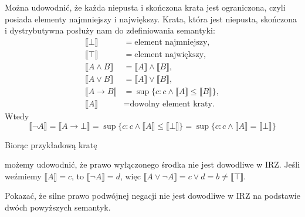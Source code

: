 \documentclass[polish,pretty]{angav}
\begin{document}
Można udowodnić, że każda niepusta i skończona krata jest ograniczona, czyli posiada elementy najmniejszy i największy. Krata, która jest niepusta, skończona i dystrybutywna posłuży nam do zdefiniowania semantyki:
\begin{align*}
    \llbracket \bot \rrbracket &= \text{element najmniejszy}, \\
    \llbracket \top \rrbracket &= \text{element największy}, \\
    \llbracket A \land B \rrbracket &= \llbracket A \rrbracket \land \llbracket B \rrbracket, \\
    \llbracket A \lor B \rrbracket &= \llbracket A \rrbracket \lor \llbracket B \rrbracket, \\
    \llbracket A \to B \rrbracket &= \sup\{c : c \land \llbracket A \rrbracket \leq \llbracket B \rrbracket\}, \\
    \llbracket A \rrbracket &= \text{dowolny element kraty.}
\end{align*}
Wtedy
\[ \llbracket \neg A \rrbracket = \llbracket A \to \bot \rrbracket = \sup\{c : c \land \llbracket A \rrbracket \leq \llbracket \bot \rrbracket\} = \sup\{c : c \land \llbracket A \rrbracket = \llbracket \bot \rrbracket\} \]

Biorąc przykładową kratę
\begin{figure}[H]
    \centering
\end{figure}
możemy udowodnić, że prawo wyłączonego środka nie jest dowodliwe w IRZ. Jeśli weźmiemy $\llbracket A \rrbracket = c$, to $\llbracket \neg A \rrbracket = d$, więc $\llbracket A \lor \neg A \rrbracket = c \lor d = b \neq \llbracket \top \rrbracket$.

\begin{problem}
    Pokazać, że silne prawo podwójnej negacji nie jest dowodliwe w IRZ na podstawie dwóch powyższych semantyk.
\end{problem}
\end{document}
